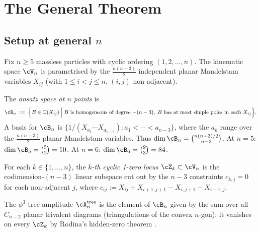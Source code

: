 %

\section{The General Theorem}
\label{sec:general}

\subsection{Setup at general \texorpdfstring{$n$}{n}}
\label{ssec:setup-n}

Fix $n \geq 5$ massless particles with cyclic ordering
$(1, 2, \ldots, n)$.
The kinematic space $\cV_n$ is parametrised by
the $\frac{n(n-3)}{2}$ independent planar Mandelstam variables
$X_{ij}$ (with $1 \leq i < j \leq n$, $(i,j)$ non-adjacent).

\begin{definition}
\label{def:ansatz}
The \emph{ansatz space at $n$ points} is
\[
  \cB_n \;:=\;
  \Bigl\{
    B \in \mathbb{C}(X_{ij})
    \;\Big|\;
    B \text{ is homogeneous of degree } {-(n-3)},\;
    B \text{ has at most simple poles in each } X_{ij}
  \Bigr\}.
\]
A basis for $\cB_n$ is $\{1/(X_{a_1}\cdots X_{a_{n-3}}) :
a_1 < \cdots < a_{n-3}\}$, where the $a_k$ range over the
$\frac{n(n-3)}{2}$ planar Mandelstam variables. Thus
$\dim \cB_n = \binom{n(n-3)/2}{n-3}$.
At $n=5$: $\dim \cB_5 = \binom{5}{2} = 10$.
At $n=6$: $\dim \cB_6 = \binom{9}{3} = 84$.
\end{definition}

\begin{definition}
\label{def:1zero}
For each $k \in \{1, \ldots, n\}$, the \emph{$k$-th cyclic
1-zero locus} $\cZ_k \subset \cV_n$ is the codimension-$(n-3)$
linear subspace cut out by the $n-3$ constraints
$c_{k,j} = 0$ for each non-adjacent $j$, where
$c_{ij} := X_{ij} + X_{i+1,j+1} - X_{i,j+1} - X_{i+1,j}$.
\end{definition}

The $\phi^3$ tree amplitude $\cA_n^{\mathrm{tree}}$ is the
element of $\cB_n$ given by the sum over all $C_{n-2}$ planar
trivalent diagrams (triangulations of the convex $n$-gon);
it vanishes on every $\cZ_k$ by Rodina's hidden-zero theorem
\cite{Rodina2024}.

